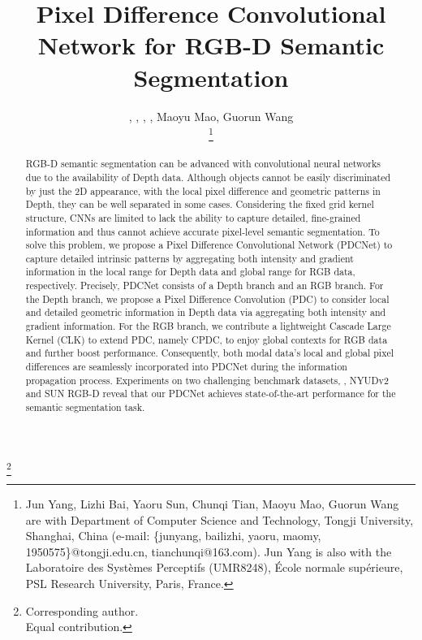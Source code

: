 \documentclass[lettersize,journal]{IEEEtran}
\begin{document}
\title{Pixel Difference Convolutional Network for RGB-D Semantic Segmentation}
\author{, , , , Maoyu Mao, Guorun Wang

\thanks{Jun Yang, Lizhi Bai, Yaoru Sun, Chunqi Tian, Maoyu Mao, Guorun Wang are with Department
    of Computer Science and Technology, Tongji University, Shanghai, China
    (e-mail: \{junyang, bailizhi, yaoru, maomy, 1950575\}@tongji.edu.cn, tianchunqi@163.com).
    Jun Yang is also with the Laboratoire des Systèmes Perceptifs (UMR8248),
École normale supérieure,
PSL Research University, Paris, France.}
    }



\maketitle
\footnote{
{} Corresponding author. \\
{} Equal contribution.}

\maketitle

\begin{abstract}
RGB-D semantic segmentation can be advanced with convolutional neural networks due to the availability of Depth data. Although objects cannot be easily discriminated by just the 2D appearance, with the local pixel difference and geometric patterns in Depth, they can be well separated in some cases. Considering the fixed grid kernel structure, CNNs are limited to lack the ability to capture detailed, fine-grained information and thus cannot achieve accurate pixel-level semantic segmentation. To solve this problem, we propose a Pixel Difference Convolutional Network (PDCNet) to capture detailed intrinsic patterns by aggregating both intensity and gradient information in the local range for Depth data and global range for RGB data, respectively. Precisely, PDCNet consists of a Depth branch and an RGB branch. For the Depth branch, we propose a Pixel Difference Convolution (PDC) to consider local and detailed geometric information in Depth data via aggregating both intensity and gradient information. For the RGB branch, we contribute a lightweight Cascade Large Kernel (CLK) to extend PDC, namely CPDC, to enjoy global contexts for RGB data and further boost performance. Consequently, both modal data's local and global pixel differences are seamlessly incorporated into PDCNet during the information propagation process. Experiments on two challenging benchmark datasets, , NYUDv2 and SUN RGB-D reveal that our PDCNet achieves state-of-the-art performance for the semantic segmentation task.
\end{abstract}
\end{document}

